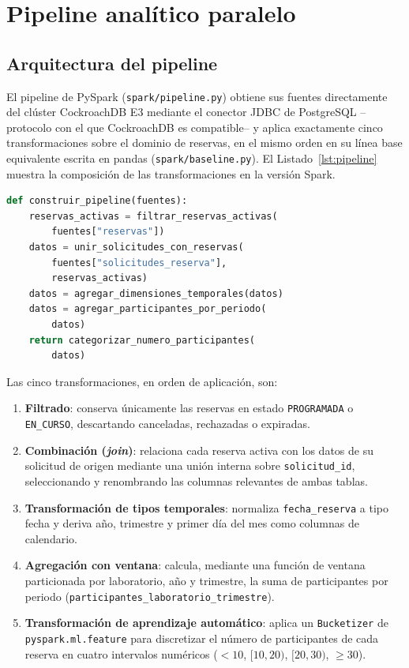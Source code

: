 \documentclass[10pt,twocolumn]{article}
\begin{document}
\section{Pipeline analítico paralelo}
\label{sec:pipeline}

\subsection{Arquitectura del pipeline}

El pipeline de PySpark (\texttt{spark/pipeline.py}) obtiene sus fuentes
directamente del clúster CockroachDB E3 mediante el conector JDBC de
PostgreSQL --protocolo con el que CockroachDB es compatible-- y aplica
exactamente cinco transformaciones sobre el dominio de reservas, en el
mismo orden en su línea base equivalente escrita en pandas
(\texttt{spark/baseline.py}). El Listado~\ref{lst:pipeline} muestra la
composición de las transformaciones en la versión Spark.

\begin{lstlisting}[language=Python,caption={Composición de las cinco transformaciones del pipeline (\texttt{spark/pipeline.py}).},label={lst:pipeline}]
def construir_pipeline(fuentes):
    reservas_activas = filtrar_reservas_activas(
        fuentes["reservas"])
    datos = unir_solicitudes_con_reservas(
        fuentes["solicitudes_reserva"],
        reservas_activas)
    datos = agregar_dimensiones_temporales(datos)
    datos = agregar_participantes_por_periodo(
        datos)
    return categorizar_numero_participantes(
        datos)
\end{lstlisting}

Las cinco transformaciones, en orden de aplicación, son:

\begin{enumerate}[leftmargin=*,itemsep=1pt]
  \item \textbf{Filtrado}: conserva únicamente las reservas en estado
  \texttt{PROGRAMADA} o \texttt{EN\_CURSO}, descartando canceladas,
  rechazadas o expiradas.
  \item \textbf{Combinación (\emph{join})}: relaciona cada reserva activa
  con los datos de su solicitud de origen mediante una unión interna sobre
  \texttt{solicitud\_id}, seleccionando y renombrando las columnas
  relevantes de ambas tablas.
  \item \textbf{Transformación de tipos temporales}: normaliza
  \texttt{fecha\_reserva} a tipo fecha y deriva año, trimestre y primer día
  del mes como columnas de calendario.
  \item \textbf{Agregación con ventana}: calcula, mediante una función de
  ventana particionada por laboratorio, año y trimestre, la suma de
  participantes por periodo (\texttt{participantes\_laboratorio\_trimestre}).
  \item \textbf{Transformación de aprendizaje automático}: aplica un
  \texttt{Bucketizer} de \texttt{pyspark.ml.feature} para discretizar el
  número de participantes de cada reserva en cuatro intervalos numéricos
  ($<10$, $[10,20)$, $[20,30)$, $\geq 30$).
\end{enumerate}
\end{document}
